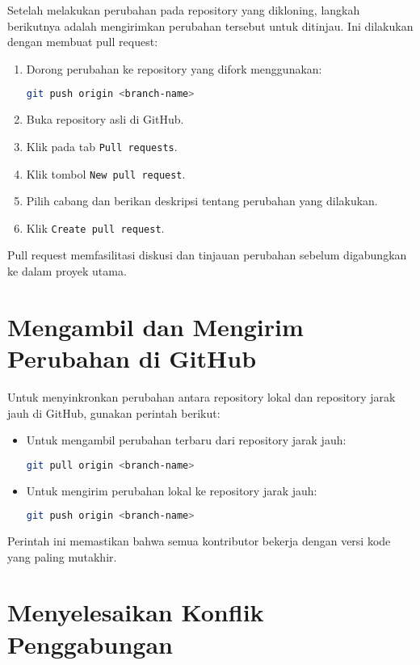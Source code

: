 Setelah melakukan perubahan pada repository yang dikloning, langkah berikutnya adalah mengirimkan perubahan tersebut untuk ditinjau. Ini dilakukan dengan membuat pull request:

\begin{enumerate}
	\item Dorong perubahan ke repository yang difork menggunakan:
	\begin{lstlisting}[language=bash]
		git push origin <branch-name>
	\end{lstlisting}
	\item Buka repository asli di GitHub.
	\item Klik pada tab \texttt{Pull requests}.
	\item Klik tombol \texttt{New pull request}.
	\item Pilih cabang dan berikan deskripsi tentang perubahan yang dilakukan.
	\item Klik \texttt{Create pull request}.
\end{enumerate}

Pull request memfasilitasi diskusi dan tinjauan perubahan sebelum digabungkan ke dalam proyek utama.

\section{Mengambil dan Mengirim Perubahan di GitHub}

Untuk menyinkronkan perubahan antara repository lokal dan repository jarak jauh di GitHub, gunakan perintah berikut:

\begin{itemize}
	\item Untuk mengambil perubahan terbaru dari repository jarak jauh:
	\begin{lstlisting}[language=bash]
		git pull origin <branch-name>
	\end{lstlisting}
	\item Untuk mengirim perubahan lokal ke repository jarak jauh:
	\begin{lstlisting}[language=bash]
		git push origin <branch-name>
	\end{lstlisting}
\end{itemize}

Perintah ini memastikan bahwa semua kontributor bekerja dengan versi kode yang paling mutakhir.

\section{Menyelesaikan Konflik Penggabungan}

